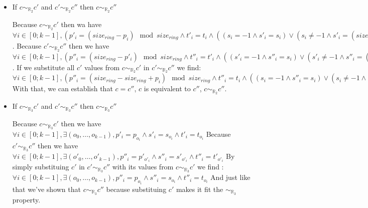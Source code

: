 \documentclass{article}
\begin{document}
\begin{itemize}
\begin{itemize}
        \item \begin{center} If $c\sim_{\mathbb{R}_{2}}c'$ and $c'\sim_{\mathbb{R}_{2}}c''$ then $c\sim_{\mathbb{R}_{2}}c''$\end{center}
        Because $c\sim_{\mathbb{R}_{2}}c'$ then wa have $\forall i \in [0; k-1],  (p'_{i} =  (size_{ring} - p_{i})\mod{size_{ring}} \land t'_{i} = t_{i} \land  ( (s_{i} = -1 \land s'_{i} = s_{i}) \lor  (s_{i} \not= -1 \land s'_{i} =  (size_{ring} - s_{i})\mod{size_{ring}})) \bigvee  (p'_{i} = p_{i} \land s'_{i} = s_{i} \land t'_{i} = t_{i}))$.\newline
        Because $c'\sim_{\mathbb{R}_{2}}c''$ then we have $\forall i \in [0; k-1],  (p''_{i} =  (size_{ring} - p'_{i})\mod{size_{ring}} \land t''_{i} = t'_{i} \land  ( (s'_{i} = -1 \land s''_{i} = s_{i}) \lor  (s'_{i} \not= -1 \land s''_{i} =  (size_{ring} - s'_{i})\mod{size_{ring}})) \bigvee  (p''_{i} = p'_{i} \land s''_{i} = s'_{i} \land t''_{i} = t'_{i}))$.\newline
        If we substitute all $c'$ values from $c\sim_{\mathbb{R}_{2}}c'$ in $c'\sim_{\mathbb{R}_{2}}c''$ we find:\newline
        $\forall i \in [0; k-1],  (p''_{i} =  (size_{ring} - size_{ring} + p_{i})\mod{size_{ring}} \land t''_{i} = t_{i} \land  ( (s_{i} = -1 \land s''_{i} = s_{i}) \lor  (s_{i} \not= -1 \land s''_{i} =  (size_{ring} - size_{ring} + s_{i})\mod{size_{ring}})) \bigvee  (p''_{i} = p_{i} \land s''_{i} = s_{i} \land t''_{i} = t_{i}))$\newline
        With that, we can establish that $c = c''$, $c$ is equivalent to $c''$, $c\sim_{\mathbb{R}_{2}}c''$.

        \item \begin{center} If $c\sim_{\mathbb{R}_{3}}c'$ and $c'\sim_{\mathbb{R}_{3}}c''$ then $c\sim_{\mathbb{R}_{3}}c''$\end{center}
        Because $c\sim_{\mathbb{R}_{3}}c'$ then we have $\forall i \in [0;k-1], \exists  (o_{0},\dots, o_{k-1}), p'_{i} = p_{o_{i}} \land s'_{i} = s_{o_{i}} \land t'_{i} = t_{o_{i}} $\newline
        Because $c'\sim_{\mathbb{R}_{3}}c''$ then we have $\forall i \in [0;k-1], \exists  (o'_{0},\dots, o'_{k-1}), p''_{i} = p'_{o'_{i}} \land s''_{i} = s'_{o'_{i}} \land t''_{i} = t'_{o'_{i}} $\newline
        By simply substituing $c'$ in $c'\sim_{\mathbb{R}_{3}}c''$ with its values from $c\sim_{\mathbb{R}_{3}}c'$ we find :\newline
        $\forall i \in [0;k-1], \exists  (o_{0},\dots, o_{k-1}), p''_{i} = p_{o_{i}} \land s''_{i} = s_{o_{i}} \land t''_{i} = t_{o_{i}} $\newline
        And just like that we've shown that $c\sim_{\mathbb{R}_{3}}c''$ because substituing $c'$ makes it fit the $\sim_{\mathbb{R}_{3}}$ property.
    
    \end{itemize}
\end{itemize}
\end{document}
